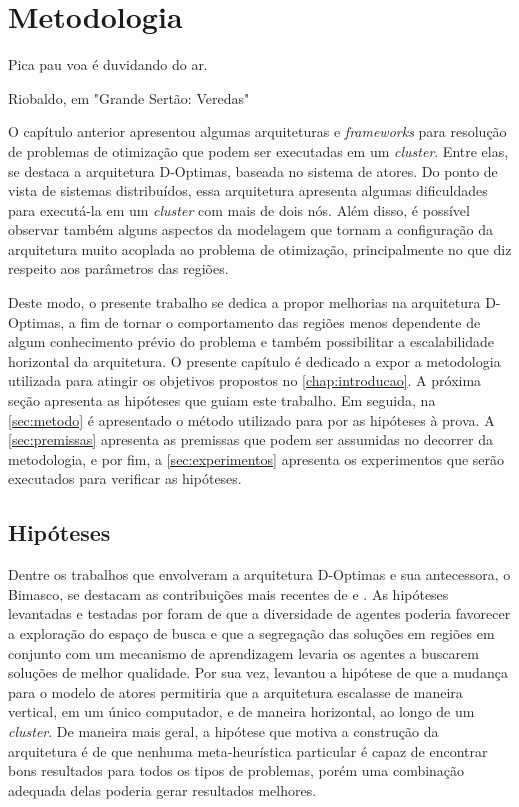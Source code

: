 \chapter{Metodologia}
\label{chap:metodologia}

\epigraph{Pica pau voa é duvidando do ar.}{Riobaldo, em "Grande Sertão: Veredas"}


O capítulo anterior apresentou algumas arquiteturas e \textit{frameworks} para resolução de problemas de otimização que podem ser executadas em um \textit{cluster}. Entre elas, se destaca a arquitetura D-Optimas, baseada no sistema de atores. Do ponto de vista de sistemas distribuídos, essa arquitetura apresenta algumas dificuldades para executá-la em um \textit{cluster} com mais de dois nós. Além disso, é possível observar também alguns aspectos da modelagem que tornam a configuração da arquitetura muito acoplada ao problema de otimização, principalmente no que diz respeito aos parâmetros das regiões.

Deste modo, o presente trabalho se dedica a propor melhorias na arquitetura D-Optimas, a fim de tornar o comportamento das regiões menos dependente de algum conhecimento prévio do problema e também possibilitar a escalabilidade horizontal da arquitetura. O presente capítulo é dedicado a expor a metodologia utilizada para atingir os objetivos propostos no \autoref{chap:introducao}. A próxima seção apresenta as hipóteses que guiam este trabalho. Em seguida, na \autoref{sec:metodo} é apresentado o método utilizado para por as hipóteses à prova. A \autoref{sec:premissas} apresenta as premissas que podem ser assumidas no decorrer da metodologia, e por fim, a \autoref{sec:experimentos} apresenta os experimentos que serão executados para verificar as hipóteses.


\section{Hipóteses}
\label{sec:hipoteses}
Dentre os trabalhos que envolveram a arquitetura D-Optimas e sua antecessora, o Bimasco, se destacam as contribuições mais recentes de  e . As hipóteses levantadas e testadas por  foram de que a diversidade de agentes poderia favorecer a exploração do espaço de busca e que a segregação das soluções em regiões em conjunto com um mecanismo de aprendizagem levaria os agentes a buscarem soluções de melhor qualidade. Por sua vez,  levantou a hipótese de que a mudança para o modelo de atores permitiria que a arquitetura escalasse de maneira vertical, em um único computador, e de maneira horizontal, ao longo de um \textit{cluster}. De maneira mais geral, a hipótese que motiva a construção da arquitetura é de que nenhuma meta-heurística particular é capaz de encontrar bons resultados para todos os tipos de problemas, porém uma combinação adequada delas poderia gerar resultados melhores. 

